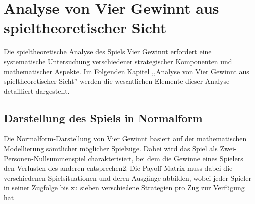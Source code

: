 \chapter{Analyse von Vier Gewinnt aus spieltheoretischer Sicht}

%

Die spieltheoretische Analyse des Spiels Vier Gewinnt erfordert eine systematische Untersuchung verschiedener strategischer Komponenten und mathematischer Aspekte. Im Folgenden Kapitel ,,Analyse von Vier Gewinnt aus spieltheoretischer Sicht'' werden die wesentlichen Elemente dieser Analyse detailliert dargestellt.
\section{Darstellung des Spiels in Normalform}
%

Die Normalform-Darstellung von Vier Gewinnt basiert auf der mathematischen Modellierung sämtlicher möglicher Spielzüge. Dabei wird das Spiel als Zwei-Personen-Nullsummenspiel charakterisiert, bei dem die Gewinne eines Spielers den Verlusten des anderen entsprechen2. Die Payoff-Matrix muss dabei die verschiedenen Spielsituationen und deren Ausgänge abbilden, wobei jeder Spieler in seiner Zugfolge bis zu sieben verschiedene Strategien pro Zug zur Verfügung hat
